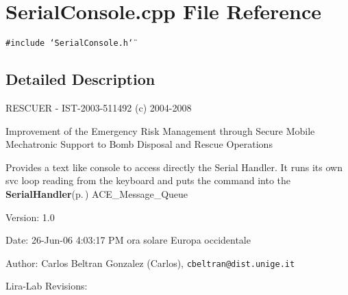 \section{Serial\-Console.cpp File Reference}
\label{SerialConsole_8cpp}
{\tt \#include \char`\"{}Serial\-Console.h\char`\"{}}\par


\subsection{Detailed Description}
RESCUER - IST-2003-511492 (c) 2004-2008

Improvement of the Emergency Risk Management through Secure Mobile Mechatronic Support to Bomb Disposal and Rescue Operations

Provides a text like console to access directly the Serial Handler. It runs its own svc loop reading from the keyboard and puts the command into the {\bf Serial\-Handler}{\rm (p.\,\pageref{classSerialHandler})} ACE\_\-Message\_\-Queue \begin{Desc}
\item[Version:]1.0 \end{Desc}
\begin{Desc}
\item[Date:]26-Jun-06 4:03:17 PM ora solare Europa occidentale \end{Desc}
\begin{Desc}
\item[Author:]Carlos Beltran Gonzalez (Carlos), {\tt cbeltran@dist.unige.it} 

Lira-Lab Revisions:\end{Desc}
